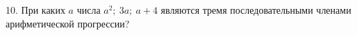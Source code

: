 10. При каких $a$ числа $a^2;\ 3a;\ a+4$ являются тремя последовательными членами арифметической прогрессии?\\
